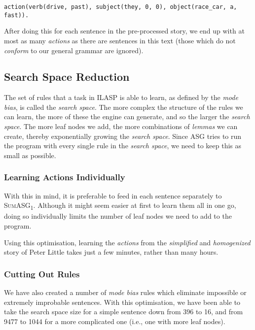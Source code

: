 \begin{displayquote}
\begin{lstlisting}[numbers=none]
action(verb(drive, past), subject(they, 0, 0), object(race_car, a, fast)).
\end{lstlisting}
\end{displayquote}

\noindent
After doing this for each sentence in the pre-processed story, we end up with at most as many \textit{actions} as there are sentences in this text (those which do not \textit{conform} to our general grammar are ignored).

\subsection{Search Space Reduction}
\label{subsec:search_space}

The set of rules that a task in ILASP is able to learn, as defined by the \textit{mode bias}, is called the \textit{search space}. The more complex the structure of the rules we can learn, the more of these the engine can generate, and so the larger the \textit{search space}. The more leaf nodes we add, the more combinations of \textit{lemmas} we can create, thereby exponentially growing the \textit{search space}. Since ASG tries to run the program with every single rule in the \textit{search space}, we need to keep this as small as possible.

\subsubsection*{Learning Actions Individually}

With this in mind, it is preferable to feed in each sentence separately to \textsc{SumASG\textsubscript{1}}. Although it might seem easier at first to learn them all in one go, doing so individually limits the number of leaf nodes we need to add to the program.

Using this optimisation, learning the \textit{actions} from the \textit{simplified} and \textit{homogenized} story of Peter Little takes just a few minutes, rather than many hours.

\subsubsection*{Cutting Out Rules}

We have also created a number of \textit{mode bias} rules which eliminate impossible or extremely improbable sentences. With this optimisation, we have been able to take the search space size for a simple sentence down from 396 to 16, and from 9477 to 1044 for a more complicated one (i.e., one with more leaf nodes).

